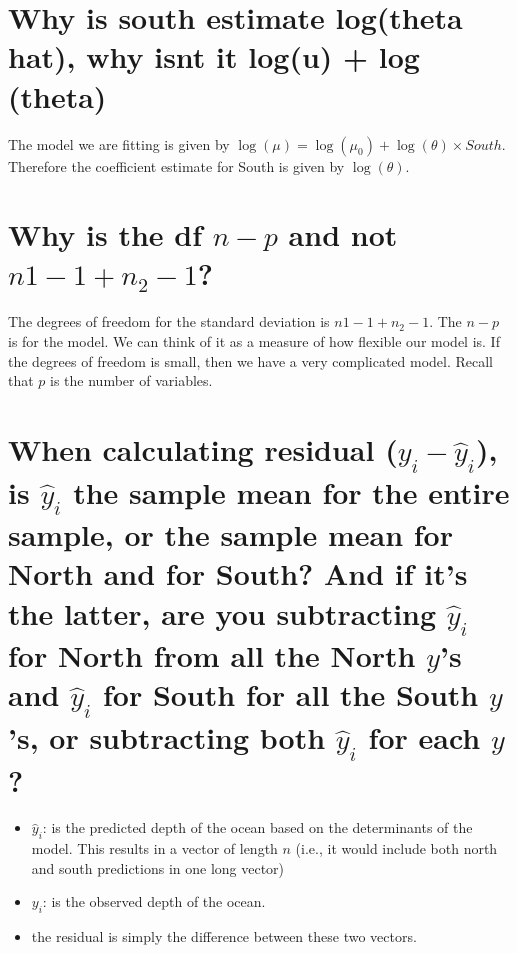 \documentclass[landscape,twocolumn,letterpaper,9pt,reqno]{article}
\begin{document}
\section{Why is south estimate log(theta hat), why isnt it log(u) + log (theta)}

The model we are fitting is given by $\log(\mu) = \log(\mu_0) + \log(\theta) \times South$. Therefore the coefficient estimate for South is given by $\log(\theta)$.

\section{Why is the df $n-p$ and not $n1-1+n_2-1$?}
The degrees of freedom for the standard deviation is $n1-1+n_2-1$. The $n-p$ is for the model. We can think of it as a measure of how flexible our model is. If the degrees of freedom is small, then we have a very complicated model. Recall that $p$ is the number of variables. 

\section{When calculating residual ($y_i - \hat{y}_i$), is $\hat{y}_i$ the sample mean for the entire sample, or the sample mean for North and for South? And if it's the latter, are you subtracting $\hat{y}_i$ for North from all the North $y$'s and $\hat{y}_i$ for South for all the South $y$'s, or subtracting both $\hat{y}_i$ for each $y$?}

\begin{itemize}
	\item $\hat{y}_i$: is the predicted depth of the ocean based on the determinants of the model. This results in a vector of length $n$ (i.e., it would include both north and south predictions in one long vector)
	\item $y_i$: is the observed depth of the ocean. 
	\item the residual is simply the difference between these two vectors. 
\end{itemize}
\end{document}
